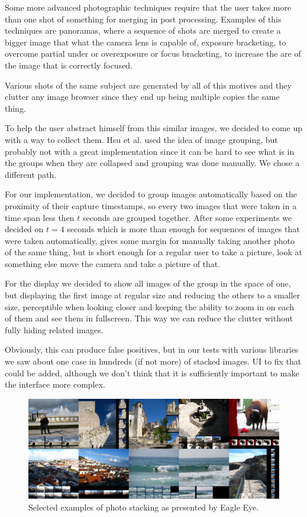 Some more advanced photographic techniques require that the user takes more than one shot of something for merging in post processing. Examples of this techniques are panoramas, where a sequence of shots are merged to create a bigger image that what the camera lens is capable of, exposure bracketing, to overcome partial under or overexposure or focus bracketing, to increase the are of the image that is correctly focused.

Various shots of the same subject are generated by all of this motives and they clutter any image browser since they end up being multiple copies the same thing.

To help the user abstract himself from this similar images, we decided to come up with a way to collect them. Hsu et al. \cite{Hsu:2009p2696} used the idea of image grouping, but probably not with a great implementation since it can be hard to see what is in the groups when they are collapsed and grouping was done manually. We chose a different path.

For our implementation, we decided to group images automatically based on the proximity of their capture timestamps, so every two images that were taken in a time span less then $t$ seconds are grouped together. After some experiments we decided on $t=4$ seconds which is more than enough for sequences of images that were taken automatically, gives some margin for manually taking another photo of the same thing, but is short enough for a regular user to take a picture, look at something else move the camera and take a picture of that.

For the display we decided to show all images of the group in the space of one, but displaying the first image at regular size and reducing the others to a smaller size, perceptible when looking closer and keeping the ability to zoom in on each of them and see them in fullscreen. This way we can reduce the clutter without fully hiding related images.

Obviously, this can produce false positives, but in our tests with various libraries we saw about one case in hundreds (if not more) of stacked images. \ac{UI} to fix that could be added, although we don't think that it is sufficiently important to make the interface more complex.

\begin{figure}[htbp]
	\centering
		\includegraphics[width=\linewidth]{Figures/stacks-motives.png}
	\vspace{-10px}
	\caption{Selected examples of photo stacking as presented by Eagle Eye.}
	\label{fig:stacks1}
	\vspace{-5px}
\end{figure}

